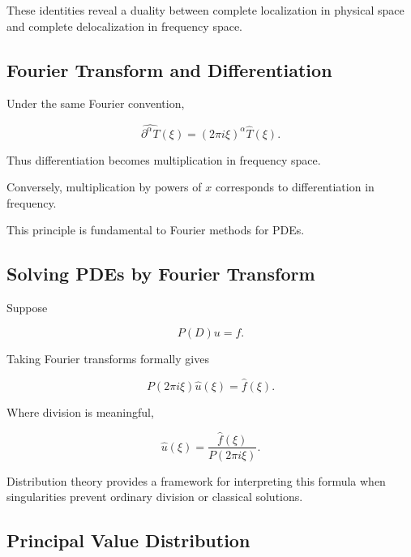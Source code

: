These identities reveal a duality between complete localization in
physical space and complete delocalization in frequency space.

\subsection{Fourier Transform and Differentiation}
\label{subsec:fourier-distribution-differentiation}

Under the same Fourier convention,

\[
\boxed{
\widehat{\partial^\alpha T}(\xi)
=
(2\pi i\xi)^\alpha
\widehat{T}(\xi).
}
\]

Thus differentiation becomes multiplication in frequency space.

Conversely, multiplication by powers of \(x\) corresponds to
differentiation in frequency.

This principle is fundamental to Fourier methods for PDEs.

\subsection{Solving PDEs by Fourier Transform}
\label{subsec:distribution-fourier-pde}

Suppose

\[
P(D)u=f.
\]

Taking Fourier transforms formally gives

\[
\boxed{
P(2\pi i\xi)\widehat{u}(\xi)
=
\widehat{f}(\xi).
}
\]

Where division is meaningful,

\[
\boxed{
\widehat{u}(\xi)
=
\frac{\widehat{f}(\xi)}
{P(2\pi i\xi)}.
}
\]

Distribution theory provides a framework for interpreting this formula
when singularities prevent ordinary division or classical solutions.

\subsection{Principal Value Distribution}
\label{subsec:principal-value-distribution}

